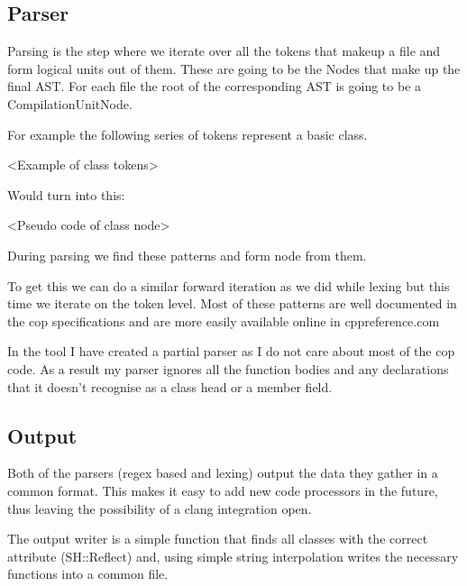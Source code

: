 \subsection{Parser}
Parsing is the step where we iterate over all the tokens that makeup a file and form logical units out of them.
These are going to be the Nodes that make up the final AST. For each file the root of the corresponding AST is going to be a CompilationUnitNode.

For example the following series of tokens represent a basic class.

<Example of class tokens>

Would turn into this:

<Pseudo code of class node>

During parsing we find these patterns and form node from them.

To get this we can do a similar forward iteration as we did while lexing but this time we iterate on the token level.
Most of these patterns are well documented in the cop specifications and are more easily available online in cppreference.com

In the tool I have created a partial parser as I do not care about most of the cop code.
As a result my parser ignores all the function bodies and any declarations that it doesn't recognise as a class head or a member field.

\subsection{Output}
Both of the parsers (regex based and lexing) output the data they gather in a common format.
This makes it easy to add new code processors in the future, thus leaving the possibility of a clang integration open.

The output writer is a simple function that finds all classes with the correct attribute (SH::Reflect) and,
using simple string interpolation writes the necessary functions into a common file.

